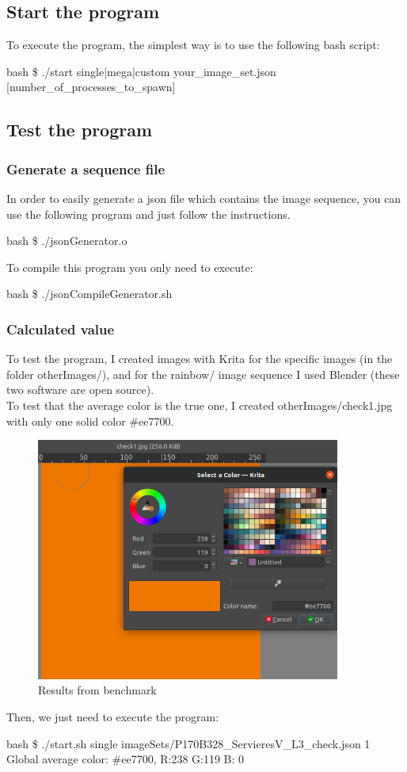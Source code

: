 \subsection{Start the program}
To execute the program, the simplest way is to use the following bash script:
\begin{resultbox}
    bash \$ ./start single|mega|custom your\_image\_set.json [number\_of\_processes\_to\_spawn]
\end{resultbox}

\subsection{Test the program}
\subsubsection{Generate a sequence file}
In order to easily generate a json file which contains the image sequence, you can use the following program and just follow the instructions.
\begin{resultbox}
    bash \$ ./jsonGenerator.o
\end{resultbox}
To compile this program you only need to execute:
\begin{resultbox}
    bash \$ ./jsonCompileGenerator.sh
\end{resultbox}
\subsubsection{Calculated value}
To test the program, I created images with Krita for the specific images (in the folder otherImages/), and for the rainbow/ image sequence I used Blender (these two software are open source).\\
To test that the average color is the true one, I created otherImages/check1.jpg with only one solid color \#ee7700.\begin{figure}[H]
    \centering
    \includegraphics[width=10cm]{images/colorcheck.png}
    \caption{Results from benchmark}
    \label{fig:colorCheck}
\end{figure}
Then, we just need to execute the program:
\begin{resultbox}
bash \$ ./start.sh single imageSets/P170B328\_ServieresV\_L3\_check.json 1\\
Global average color: \#ee7700, R:238 G:119 B:  0
\end{resultbox}

